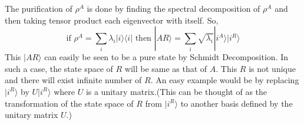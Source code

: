 The purification of $\rho^A$ is done by finding the spectral decomposition of $\rho^A$ and then taking tensor product each eigenvector with itself. So, 
\begin{equation}
\text{if } \rho^A = \sum_i \lambda_i |i\rangle \langle i| \text{ then } |AR\rangle = \sum_i \sqrt{\lambda_i} |i^A\rangle |i^R\rangle 
\end{equation}This $|AR\rangle$ can easily be seen to be a pure state by Schmidt Decomposition. In such a case, the state space of $R$ will be same as that of $A$. This $R$ is not unique and there will exist infinite number of $R$. An easy example would be by replacing $|i^R\rangle$ by $U|i^R\rangle$ where $U$ is a unitary matrix.(This can be thought of as the transformation of the state space of $R$ from $|i^R\rangle$ to another basis  defined by the unitary matrix $U$.)
